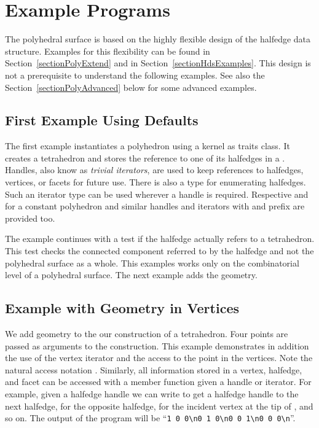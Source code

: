 \section{Example Programs}
\label{sectionPolyExamples}

The polyhedral surface is based on the highly flexible design of the
halfedge data structure. Examples for this flexibility can be found in
Section~\ref{sectionPolyExtend} and in Section~\ref{sectionHdsExamples}. 
This design is not a prerequisite to understand the following examples.
See also the Section~\ref{sectionPolyAdvanced} below for some advanced 
examples.

\subsection{First Example Using Defaults}

The first example instantiates a polyhedron using a kernel as traits
class. It creates a tetrahedron and stores the reference to one of its
halfedges in a . Handles, also know as
{\em trivial iterators}, are used to keep references to halfedges,
vertices, or facets for future use. There is also a 
type for enumerating halfedges. Such an iterator type can be used 
wherever a handle is required. Respective  and
 for a constant polyhedron and similar
handles and iterators with  and  prefix
are provided too.

The example continues with a test if the halfedge
actually refers to a tetrahedron. This test checks the connected 
component referred to by the halfedge  and not the polyhedral
surface as a whole. This examples works only on the combinatorial
level of a polyhedral surface. The next example adds the geometry.


\subsection{Example with Geometry in Vertices}

We add geometry to the our construction of a tetrahedron. Four points
are passed as arguments to the construction. This example demonstrates
in addition the use of the vertex iterator and the access to the point
in the vertices. Note the natural access notation .
Similarly, all information stored in a vertex, halfedge, and facet can
be accessed with a member function given a handle or iterator. For
example, given a halfedge handle  we can write 
to get a halfedge handle to the next halfedge,  for
the opposite halfedge,  for the incident vertex at
the tip of , and so on.  The output of the program will be
``\verb|1 0 0\n0 1 0\n0 0 1\n0 0 0\n|''.

